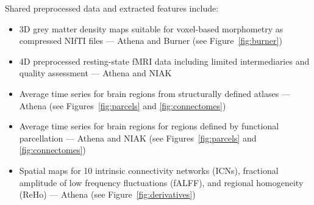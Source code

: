 \documentclass[preprint,12pt,3p]{elsarticle}
\providecommand{\tightlist}{%
  \setlength{\itemsep}{0pt}\setlength{\parskip}{0pt}}
\begin{document}
Shared preprocessed data and extracted features include:
\begin{itemize}
\tightlist
    \item 3D grey matter density maps suitable for voxel-based morphometry as compressed NIfTI files --- Athena and Burner (see Figure~\ref{fig:burner})
    \item 4D preprocessed resting-state fMRI data including limited intermediaries and quality assessment --- Athena and NIAK
    \item Average time series for brain regions from structurally defined atlases --- Athena (see Figures~\ref{fig:parcels} and \ref{fig:connectomes})
    \item Average time series for brain regions for regions defined by functional parcellation --- Athena and NIAK (see Figures~\ref{fig:parcels} and \ref{fig:connectomes})
    \item Spatial maps for 10 intrinsic connectivity networks (ICNs), fractional amplitude of low frequency fluctuations (fALFF), and regional homogeneity (ReHo) --- Athena (see Figure~\ref{fig:derivatives})
\end{itemize}


\end{document}
